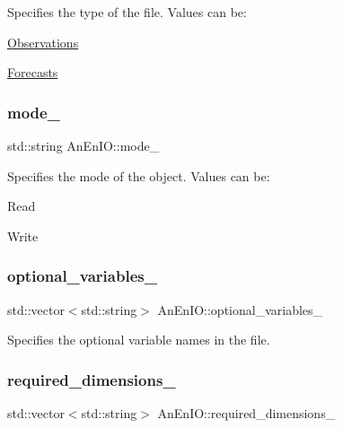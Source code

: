 Specifies the type of the file. Values can be\+:
\begin{DoxyItemize}
\item \mbox{\hyperlink{class_observations}{Observations}}
\item \mbox{\hyperlink{class_forecasts}{Forecasts}} 
\end{DoxyItemize}\mbox{\label{class_an_en_i_o_a311891a4a1a6b3907246da853bc4e5c8}} 
\subsubsection{\texorpdfstring{mode\+\_\+}{mode\_}}
{\footnotesize\ttfamily std\+::string An\+En\+I\+O\+::mode\+\_\+\hspace{0.3cm}{\ttfamily [protected]}}

Specifies the mode of the object. Values can be\+:
\begin{DoxyItemize}
\item Read
\item Write 
\end{DoxyItemize}\mbox{\label{class_an_en_i_o_a43f82ffbafbbda7ab8c9471d0bce70df}} 
\subsubsection{\texorpdfstring{optional\+\_\+variables\+\_\+}{optional\_variables\_}}
{\footnotesize\ttfamily std\+::vector$<$std\+::string$>$ An\+En\+I\+O\+::optional\+\_\+variables\+\_\+\hspace{0.3cm}{\ttfamily [protected]}}

Specifies the optional variable names in the file. \mbox{\label{class_an_en_i_o_adf42061631c78508bde00de7d22a65b4}} 
\subsubsection{\texorpdfstring{required\+\_\+dimensions\+\_\+}{required\_dimensions\_}}
{\footnotesize\ttfamily std\+::vector$<$std\+::string$>$ An\+En\+I\+O\+::required\+\_\+dimensions\+\_\+\hspace{0.3cm}{\ttfamily [protected]}}

